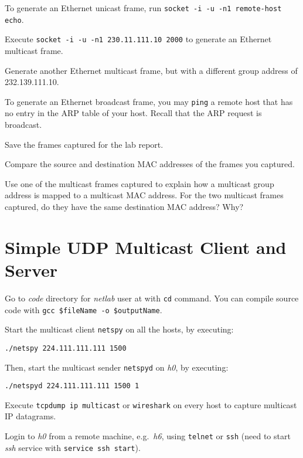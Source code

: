 \documentclass{../UTNetLab}
\begin{document}
    To generate an Ethernet unicast frame, run \lstinline[emph={your-host, remote-host}]{socket -i -u -n1 remote-host echo}.

    Execute \lstinline{socket -i -u -n1 230.11.111.10 2000} to generate an Ethernet multicast frame.

    Generate another Ethernet multicast frame, but with a different group address of {232.139.111.10}.

    To generate an Ethernet broadcast frame, you may \lstinline{ping} a remote host that has no entry in the ARP table of your host.
    Recall that the ARP request is broadcast.

    Save the frames captured for the lab report.

    \begin{report}
    \item Compare the source and destination MAC addresses of the frames you captured.

    \item Use one of the multicast frames captured to explain how a multicast group address is mapped to a multicast MAC address.
    For the two multicast frames captured, do they have the same destination MAC address?
    Why?
    \end{report}

\section{Simple UDP Multicast Client and Server}
    Go to \textit{code} directory for \textit{netlab} user at  with \lstinline{cd} command.
    You can compile source code with \lstinline[emph={$fileName, $outputName}]{gcc $fileName -o $outputName}.

    Start the multicast client \lstinline{netspy} on all the hosts, by executing:
    \begin{lstlisting}
./netspy 224.111.111.111 1500
    \end{lstlisting}
    Then, start the multicast sender \lstinline{netspyd} on \textit{h0}, by executing:
    \begin{lstlisting}
./netspyd 224.111.111.111 1500 1
    \end{lstlisting}
    Execute \lstinline{tcpdump ip multicast} or \lstinline{wireshark} on every host to capture multicast IP datagrams.

    Login to \textit{h0} from a remote machine, e.g.\ \textit{h6}, using \lstinline{telnet} or \lstinline{ssh} (need to start \textit{ssh} service with \lstinline{service ssh start}).
\end{document}
